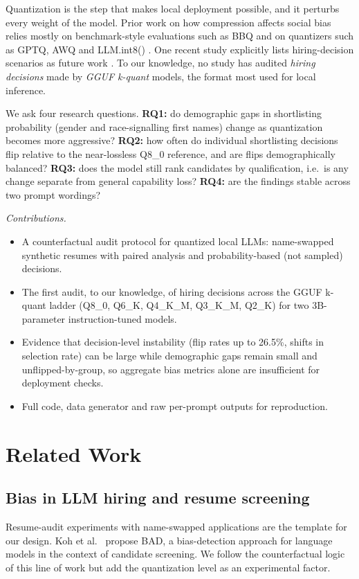 \documentclass[conference]{IEEEtran}
\begin{document}
Quantization is the step that makes local deployment possible, and it perturbs every weight of the model. Prior work on how compression affects social bias relies mostly on benchmark-style evaluations such as BBQ \cite{parrish2022} and on quantizers such as GPTQ, AWQ and LLM.int8() \cite{frantar2022,lin2024,dettmers2022}. One recent study explicitly lists hiring-decision scenarios as future work \cite{alhakim2026}. To our knowledge, no study has audited \emph{hiring decisions} made by \emph{GGUF k-quant} models, the format most used for local inference.

We ask four research questions. \textbf{RQ1:} do demographic gaps in shortlisting probability (gender and race-signalling first names) change as quantization becomes more aggressive? \textbf{RQ2:} how often do individual shortlisting decisions flip relative to the near-lossless Q8\_0 reference, and are flips demographically balanced? \textbf{RQ3:} does the model still rank candidates by qualification, i.e.\ is any change separate from general capability loss? \textbf{RQ4:} are the findings stable across two prompt wordings?

\emph{Contributions.}
\begin{itemize}
\item A counterfactual audit protocol for quantized local LLMs: name-swapped synthetic resumes with paired analysis and probability-based (not sampled) decisions.
\item The first audit, to our knowledge, of hiring decisions across the GGUF k-quant ladder (Q8\_0, Q6\_K, Q4\_K\_M, Q3\_K\_M, Q2\_K) for two 3B-parameter instruction-tuned models.
\item Evidence that decision-level instability (flip rates up to 26.5\%, shifts in selection rate) can be large while demographic gaps remain small and unflipped-by-group, so aggregate bias metrics alone are insufficient for deployment checks.
\item Full code, data generator and raw per-prompt outputs for reproduction.
\end{itemize}

\section{Related Work}
\subsection{Bias in LLM hiring and resume screening}
Resume-audit experiments with name-swapped applications \cite{bertrand2004} are the template for our design. Koh et al.\ \cite{koh2023} propose BAD, a bias-detection approach for language models in the context of candidate screening. We follow the counterfactual logic of this line of work but add the quantization level as an experimental factor.
\end{document}
